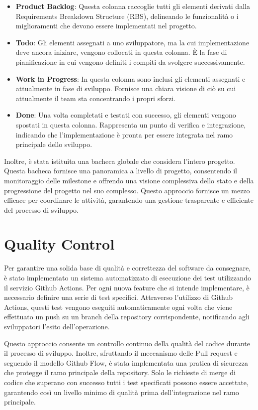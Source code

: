 \begin{itemize}
\item \textbf{Product Backlog}: Questa colonna raccoglie tutti gli elementi derivati dalla Requirements Breakdown Structure (RBS), delineando le funzionalità o i miglioramenti che devono essere implementati nel progetto.
\item \textbf{Todo}: Gli elementi assegnati a uno sviluppatore, ma la cui implementazione deve ancora iniziare, vengono collocati in questa colonna. È la fase di pianificazione in cui vengono definiti i compiti da svolgere successivamente.

\item \textbf{Work in Progress}: In questa colonna sono inclusi gli elementi assegnati e attualmente in fase di sviluppo. Fornisce una chiara visione di ciò su cui attualmente il team sta concentrando i propri sforzi.

\item \textbf{Done}: Una volta completati e testati con successo, gli elementi vengono spostati in questa colonna. Rappresenta un punto di verifica e integrazione, indicando che l'implementazione è pronta per essere integrata nel ramo principale dello sviluppo.
\end{itemize}

Inoltre, è stata istituita una bacheca globale che considera l'intero progetto. Questa bacheca fornisce una panoramica a livello di progetto, consentendo il monitoraggio delle milestone e offrendo una visione complessiva dello stato e della progressione del progetto nel suo complesso. Questo approccio fornisce un mezzo efficace per coordinare le attività, garantendo una gestione trasparente e efficiente del processo di sviluppo.

\section{Quality Control}

Per garantire una solida base di qualità e correttezza del software da consegnare, è stato implementato un sistema automatizzato di esecuzione dei test utilizzando il servizio Github Actions. Per ogni nuova feature che si intende implementare, è necessario definire una serie di test specifici. Attraverso l'utilizzo di Github Actions, questi test vengono eseguiti automaticamente ogni volta che viene effettuato un push su un branch della repository corrispondente, notificando agli sviluppatori l'esito dell'operazione.

Questo approccio consente un controllo continuo della qualità del codice durante il processo di sviluppo. Inoltre, sfruttando il meccanismo delle Pull request e seguendo il modello Github Flow, è stata implementata una pratica di sicurezza che protegge il ramo principale della repository. Solo le richieste di merge di codice che superano con successo tutti i test specificati possono essere accettate, garantendo così un livello minimo di qualità prima dell'integrazione nel ramo principale.

